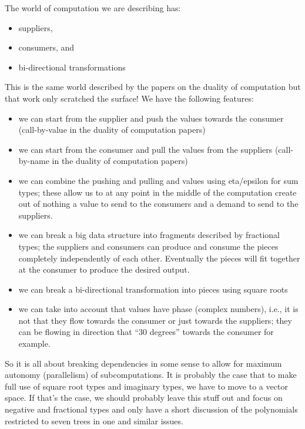 \documentclass[preprint]{sigplanconf}
\begin{document}
{The world of computation we are describing has:
\begin{itemize}
\item suppliers, 
\item consumers, and
\item bi-directional transformations
\end{itemize}
This is the same world described by the papers on the duality of computation
but that work only scratched the surface! We have the following features:
\begin{itemize}
\item we can start from the supplier and push the values towards the
  consumer (call-by-value in the duality of computation papers)
\item we can start from the consumer and pull the values from the suppliers
  (call-by-name in the duality of computation papers)
\item we can combine the pushing and pulling and values using eta/epsilon for
  sum types; these allow us to at any point in the middle of the computation
  create out of nothing a value to send to the consumers and a demand to send
  to the suppliers.
\item we can break a big data structure into fragments described by
  fractional types; the suppliers and consumers can produce and consume the
  pieces completely independently of each other. Eventually the pieces will
  fit together at the consumer to produce the desired output.
\item we can break a bi-directional transformation into pieces using square
  roots
\item we can take into account that values have phase (complex numbers),
  i.e., it is not that they flow towards the consumer or just towards the
  suppliers; they can be flowing in direction that ``30 degrees'' towards the
  consumer for example.
\end{itemize}
So it is all about breaking dependencies in some sense to allow for maximum
autonomy (parallelism) of subcomputations. It is probably the case that to
make full use of square root types and imaginary types, we have to move to a
vector space. If that's the case, we should probably leave this stuff out and
focus on negative and fractional types and only have a short discussion of
the polynomials restricted to seven trees in one and similar issues.

}
\end{document}
